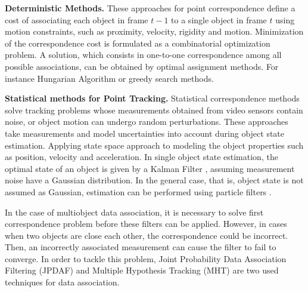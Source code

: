 \textbf{Deterministic Methods. } These approaches for point correspondence
define a cost of associating each object in frame $t-1$ to a single object in
frame $t$ using motion constraints, such as proximity, velocity, rigidity and
motion. Minimization of the correspondence cost is formulated as a
combinatorial optimization problem. A solution, which consists in one-to-one
correspondence among all possible associations, can be obtained by optimal
assignment methods. For instance Hungarian Algorithm \cite{Qin2012} or
greedy search methods.

\textbf{Statistical methods for Point Tracking. } Statistical correspondence
methods solve tracking problems whose measurements obtained from video sensors
contain noise, or object motion can undergo random perturbations. These
approaches take measurements and model uncertainties into account during
object state estimation. Applying state space approach to modeling the object
properties such as position, velocity and acceleration. In single object
state estimation, the optimal state of an object is given by a Kalman Filter
\cite{Ren2008a,Heikkila2004}, assuming measurement noise have a Gaussian
distribution. In the general case, that is, object state is not assumed as
Gaussian, estimation can be performed using particle filters
\cite{Okuma2004,Rittscher2000}.

In the case of multiobject data association, it is necessary to solve first
correspondence problem before these filters can be applied. However, in cases
when two objects are close each other, the correspondence could be incorrect.
Then, an incorrectly associated measurement can cause the filter to fail to
converge. In order to tackle this problem, Joint Probability Data Association
Filtering (JPDAF) \cite{Schulz2003} and Multiple Hypothesis Tracking
(MHT) \cite{Zulkifley2012} are two used techniques for data association.

